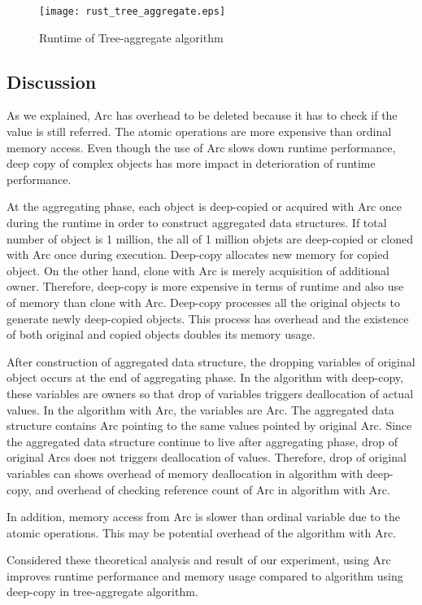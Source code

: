 \begin{figure}[htb]
    \texttt{[image: rust\_tree\_aggregate.eps]}
    \caption{Runtime of Tree-aggregate algorithm}
    \label{fig:ex_tree_agg}
\end{figure}

\subsection{Discussion}
As we explained, Arc has overhead to be deleted because it has to check if the value is still referred. The atomic operations are more expensive than ordinal memory access.
Even though the use of Arc slows down runtime performance, deep copy of complex objects has more impact in deterioration of runtime performance. 

At the aggregating phase, each object is deep-copied or acquired with Arc once during the runtime in order to construct aggregated data structures.
If total number of object is 1 million, the all of 1 million objets are deep-copied or cloned with Arc once during execution. 
Deep-copy allocates new memory for copied object. On the other hand, clone with Arc is merely acquisition of additional owner. 
Therefore, deep-copy is more expensive in terms of runtime and also use of memory than clone with Arc. 
Deep-copy processes all the original objects to generate newly deep-copied objects. 
This process has overhead and the existence of both original and copied objects doubles its memory usage.

After construction of aggregated data structure, the dropping variables of original object occurs at the end of aggregating phase.
In the algorithm with deep-copy, these variables are owners so that drop of variables triggers deallocation of actual values.
In the algorithm with Arc, the variables are Arc. The aggregated data structure contains Arc pointing to the same values pointed by original Arc.
Since the aggregated data structure continue to live after aggregating phase, drop of original Arcs does not triggers deallocation of values. 
Therefore, drop of original variables can shows overhead of memory deallocation in algorithm with deep-copy, 
and overhead of checking reference count of Arc in algorithm with Arc.

In addition, memory access from Arc is slower than ordinal variable due to the atomic operations. This may be potential overhead of the algorithm with Arc.

Considered these theoretical analysis and result of our experiment, using Arc improves runtime performance and memory usage compared to algorithm using deep-copy in tree-aggregate algorithm.